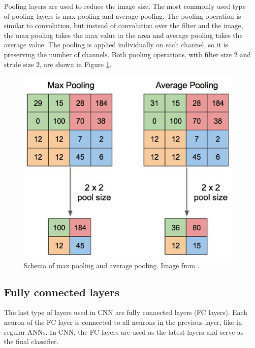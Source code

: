 \documentclass[thesis=B,english]{FITthesis}[2019/12/23]
\begin{document}
Pooling layers are used to reduce the image size. The most commonly used type of pooling layers is max pooling and average pooling. The pooling operation is similar to convolution, but instead of convolution over the filter and the image, the max pooling takes the max value in the area and average pooling takes the average value. The pooling is applied individually on each channel, so it is preserving the number of channels. Both pooling operations, with filter size 2 and stride size 2, are shown in Figure \ref{fig:pooling}.

\begin{figure}[ht]
		\includegraphics[scale=0.4]{images/pooling.png}
		\centering
		\caption{Schema of max pooling and average pooling. Image from \cite{yani_budhi_2019}.}
		\label{fig:pooling}
\end{figure}

\subsection{Fully connected layers}
The last type of layers used in CNN are fully connected layers (FC layers). Each neuron of the FC layer is connected to all neurons in the previous layer, like in regular ANNs. In CNN, the FC layers are used as the latest layers and serve as the final classifier.

\end{document}
